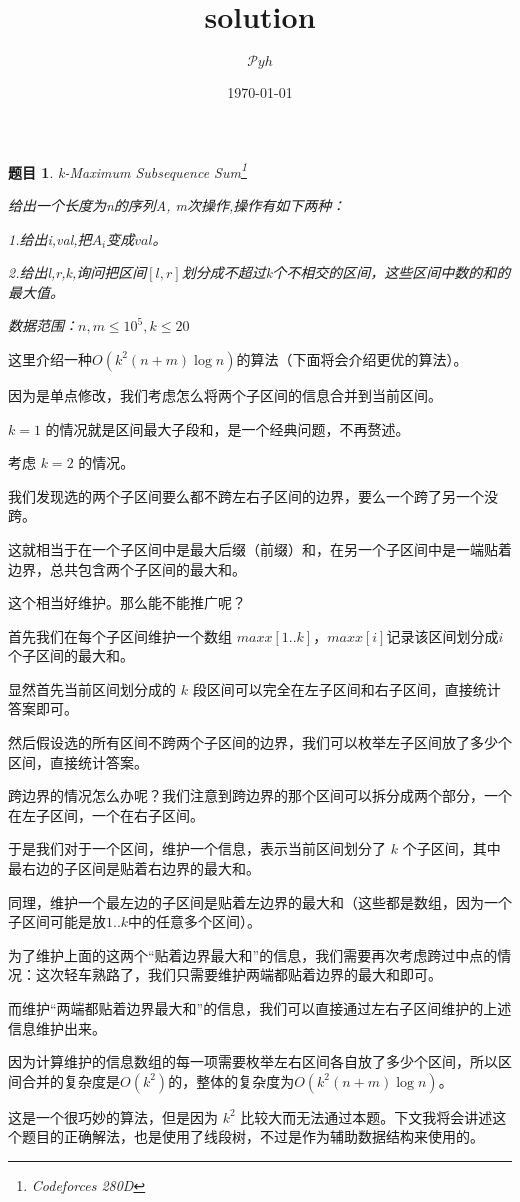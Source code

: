 \documentclass[a4paper]{article}
\date{\today}
\title{solution}
\author{$\mathcal Pyh$}
\newcommand{\kai}{\CJKfamily{kai}}
\newcommand{\song}{\CJKfamily{song}}
\newtheorem{problem}{题目}
\begin{document}
\maketitle


\song

\begin{problem}
  k-Maximum Subsequence Sum\footnote{Codeforces 280D}

  给出一个长度为n的序列A, m次操作,操作有如下两种：

  1.给出i,val,把$A_{i}$变成$val$。

  2.给出l,r,k,询问把区间$[l,r]$划分成不超过k个不相交的区间，这些区间中数的和的最大值。

  数据范围：$n,m\leq 10^5, k\leq 20$
\end{problem}

这里介绍一种$O(k^2(n+m)\log n)$的算法（下面将会介绍更优的算法）。

因为是单点修改，我们考虑怎么将两个子区间的信息合并到当前区间。

$k=1$ 的情况就是区间最大子段和，是一个经典问题，不再赘述。

考虑 $k=2$ 的情况。

我们发现选的两个子区间要么都不跨左右子区间的边界，要么一个跨了另一个没跨。

这就相当于在一个子区间中是最大后缀（前缀）和，在另一个子区间中是一端贴着边界，总共包含两个子区间的最大和。

这个相当好维护。那么能不能推广呢？

首先我们在每个子区间维护一个数组 $maxx[1..k]$，$maxx[i]$记录该区间划分成$i$个子区间的最大和。

显然首先当前区间划分成的 $k$ 段区间可以完全在左子区间和右子区间，直接统计答案即可。

然后假设选的所有区间不跨两个子区间的边界，我们可以枚举左子区间放了多少个区间，直接统计答案。

跨边界的情况怎么办呢？我们注意到跨边界的那个区间可以拆分成两个部分，一个在左子区间，一个在右子区间。

于是我们对于一个区间，维护一个信息，表示当前区间划分了 $k$ 个子区间，其中最右边的子区间是贴着右边界的最大和。

同理，维护一个最左边的子区间是贴着左边界的最大和（这些都是数组，因为一个子区间可能是放$1..k$中的任意多个区间）。

为了维护上面的这两个“贴着边界最大和”的信息，我们需要再次考虑跨过中点的情况：这次轻车熟路了，我们只需要维护两端都贴着边界的最大和即可。

而维护“两端都贴着边界最大和”的信息，我们可以直接通过左右子区间维护的上述信息维护出来。

因为计算维护的信息数组的每一项需要枚举左右区间各自放了多少个区间，所以区间合并的复杂度是$O(k^2)$的，整体的复杂度为$O(k^2(n+m)\log n)$。

这是一个很巧妙的算法，但是因为 $k^2$ 比较大而无法通过本题。下文我将会讲述这个题目的正确解法，也是使用了线段树，不过是作为辅助数据结构来使用的。
\end{document}
